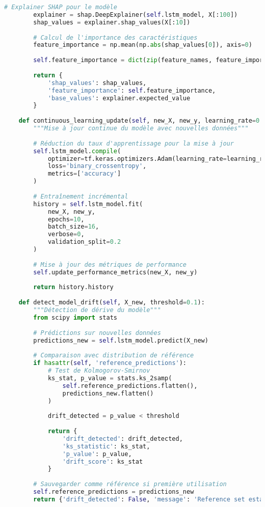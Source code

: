 \documentclass[12pt,a4paper]{report}
\begin{document}
\begin{lstlisting}[language=Python, caption=Modèle de maintenance prédictive avancé]
        # Explainer SHAP pour le modèle
        explainer = shap.DeepExplainer(self.lstm_model, X[:100])
        shap_values = explainer.shap_values(X[:10])
        
        # Calcul de l'importance des caractéristiques
        feature_importance = np.mean(np.abs(shap_values[0]), axis=0)
        
        self.feature_importance = dict(zip(feature_names, feature_importance))
        
        return {
            'shap_values': shap_values,
            'feature_importance': self.feature_importance,
            'base_values': explainer.expected_value
        }
    
    def continuous_learning_update(self, new_X, new_y, learning_rate=0.001):
        """Mise à jour continue du modèle avec nouvelles données"""
        
        # Réduction du taux d'apprentissage pour la mise à jour
        self.lstm_model.compile(
            optimizer=tf.keras.optimizers.Adam(learning_rate=learning_rate),
            loss='binary_crossentropy',
            metrics=['accuracy']
        )
        
        # Entraînement incrémental
        history = self.lstm_model.fit(
            new_X, new_y,
            epochs=10,
            batch_size=16,
            verbose=0,
            validation_split=0.2
        )
        
        # Mise à jour des métriques de performance
        self.update_performance_metrics(new_X, new_y)
        
        return history.history
    
    def detect_model_drift(self, X_new, threshold=0.1):
        """Détection de dérive du modèle"""
        from scipy import stats
        
        # Prédictions sur nouvelles données
        predictions_new = self.lstm_model.predict(X_new)
        
        # Comparaison avec distribution de référence
        if hasattr(self, 'reference_predictions'):
            # Test de Kolmogorov-Smirnov
            ks_stat, p_value = stats.ks_2samp(
                self.reference_predictions.flatten(),
                predictions_new.flatten()
            )
            
            drift_detected = p_value < threshold
            
            return {
                'drift_detected': drift_detected,
                'ks_statistic': ks_stat,
                'p_value': p_value,
                'drift_score': ks_stat
            }
        
        # Sauvegarder comme référence si première utilisation
        self.reference_predictions = predictions_new
        return {'drift_detected': False, 'message': 'Reference set established'}
\end{lstlisting}
\end{document}
